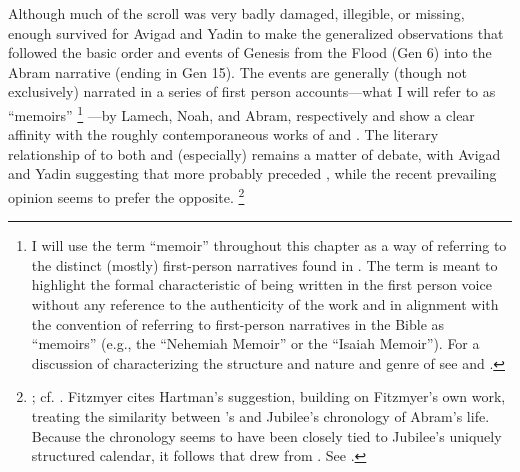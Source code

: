 Although much of the scroll was very badly damaged, illegible, or missing, enough survived for Avigad and Yadin to make the generalized observations that \ga followed the basic order and events of Genesis from the Flood (Gen 6) into the Abram narrative (ending in Gen 15). The events are generally (though not exclusively) narrated in a series of first person accounts---what I will refer to as ``memoirs''%
    \footnote{I will use the term ``memoir'' throughout this chapter as a way of referring to the distinct (mostly) first-person narratives found in \ga. The term is meant to highlight the formal characteristic of being written in the first person voice without any reference to the authenticity of the work and in alignment with the convention of referring to first-person narratives in the Bible as ``memoirs'' (e.g., the ``Nehemiah Memoir'' or the ``Isaiah Memoir''). For a discussion of characterizing the structure and nature and genre of \ga see \cite{bernstein_berthelot-etal2010} and \cite{bernasconi_as2011}.}%
---by Lamech, Noah, and Abram, respectively and show a clear affinity with the roughly contemporaneous works of \firstenoch and \jub.%
    \autocite[16--37]{avigad-yadin1956}
The literary relationship of \ga to both \firstenoch and (especially) \jub remains a matter of debate, with Avigad and Yadin suggesting that \ga more probably preceded \jub, while the recent prevailing opinion seems to prefer the opposite.%
    \footnote{\Cite[38]{avigad-yadin1956}; cf. \cite[20--21]{fitzmyer2004}. Fitzmyer cites Hartman's suggestion, building on Fitzmyer's own work, treating the similarity between \ga's and Jubilee's chronology of Abram's life. Because the chronology seems to have been closely tied to Jubilee's uniquely structured calendar, it follows that \ga drew from \jub. See \cite[497]{hartman_cbq1966}.}

